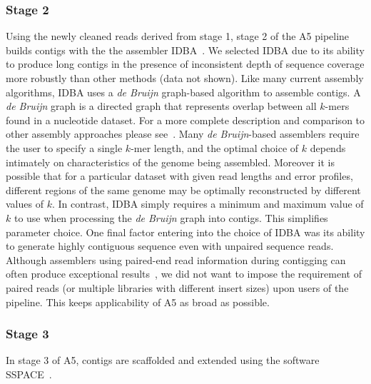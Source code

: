 \documentclass[10pt]{article}
\begin{document}
\subsubsection*{Stage 2}
Using the newly cleaned reads derived from stage 1, stage 2 of the A5 pipeline builds contigs
with the the assembler IDBA~\cite{Peng2010}. We selected IDBA due 
to its ability to produce long contigs in the presence of inconsistent depth of sequence coverage more robustly than other methods (data not shown).
Like many current assembly algorithms, IDBA uses a \emph{de Bruijn} graph-based algorithm to assemble contigs. A \emph{de Bruijn} graph is a directed graph 
that represents overlap between all $k$-mers found in a nucleotide dataset. For a more complete description and comparison to other assembly 
approaches please see~\cite{Pop2009}. Many \emph{de Bruijn}-based assemblers require the user to specify a single $k$-mer length, and the optimal 
choice of $k$ depends intimately on characteristics of the genome being assembled.  Moreover it is possible that for a particular dataset with given 
read lengths and error profiles, different regions of the same genome may be optimally reconstructed by different values of $k$. In contrast, IDBA
simply requires a minimum and maximum value of $k$ to use when processing the \emph{de Bruijn} graph into contigs. This simplifies parameter choice. 
One final factor entering into the choice of IDBA was its 
ability to generate highly contiguous sequence even with unpaired sequence reads. Although assemblers using paired-end read information during 
contigging can often produce exceptional results~\cite{Gnerre2011, SASSY}, we did not want to impose the requirement of paired reads (or multiple
libraries with different insert sizes) upon users of the pipeline. This keeps applicability of A5 as broad as possible.

\subsubsection*{Stage 3}
In stage 3 of A5, contigs are scaffolded and extended using the software SSPACE~\cite{Boetzer2011}. 
\end{document}
